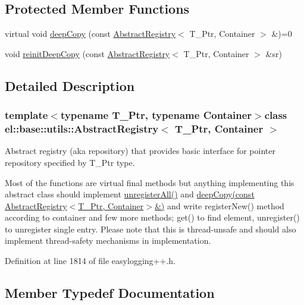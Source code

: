 \subsection*{Protected Member Functions}
\begin{DoxyCompactItemize}
\item 
virtual void \hyperlink{classel_1_1base_1_1utils_1_1_abstract_registry_aaf42dab7089a9b1198e2920983ca82bb}{deep\+Copy} (const \hyperlink{classel_1_1base_1_1utils_1_1_abstract_registry}{Abstract\+Registry}$<$ T\+\_\+\+Ptr, Container $>$ \&)=0
\item 
void \hyperlink{classel_1_1base_1_1utils_1_1_abstract_registry_a529677fb42e78d03c36cdea49f8877c9}{reinit\+Deep\+Copy} (const \hyperlink{classel_1_1base_1_1utils_1_1_abstract_registry}{Abstract\+Registry}$<$ T\+\_\+\+Ptr, Container $>$ \&sr)
\end{DoxyCompactItemize}


\subsection{Detailed Description}
\subsubsection*{template$<$typename T\+\_\+\+Ptr, typename Container$>$class el\+::base\+::utils\+::\+Abstract\+Registry$<$ T\+\_\+\+Ptr, Container $>$}

Abstract registry (aka repository) that provides basic interface for pointer repository specified by T\+\_\+\+Ptr type. 

Most of the functions are virtual final methods but anything implementing this abstract class should implement \hyperlink{classel_1_1base_1_1utils_1_1_abstract_registry_a19223bc1fea48dbe6b47b4879aa4672f}{unregister\+All()} and \hyperlink{classel_1_1base_1_1utils_1_1_abstract_registry_aaf42dab7089a9b1198e2920983ca82bb}{deep\+Copy(const Abstract\+Registry$<$\+T\+\_\+\+Ptr, Container$>$\&)} and write register\+New() method according to container and few more methods; get() to find element, unregister() to unregister single entry. Please note that this is thread-\/unsafe and should also implement thread-\/safety mechanisms in implementation. 

Definition at line 1814 of file easylogging++.\+h.



\subsection{Member Typedef Documentation}
\hypertarget{classel_1_1base_1_1utils_1_1_abstract_registry_a3bbf19b112c067cb1a02a82b003cc7e2}{}
